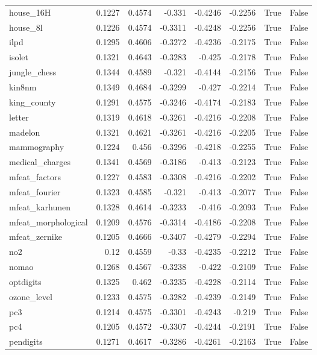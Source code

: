 \begin{table}
\begin{tabular}{lrrrrrrr}
house\_16H & 0.1227 & 0.4574 & -0.331 & -0.4246 & -0.2256 & True & False \\
house\_8l & 0.1226 & 0.4574 & -0.3311 & -0.4248 & -0.2256 & True & False \\
ilpd & 0.1295 & 0.4606 & -0.3272 & -0.4236 & -0.2175 & True & False \\
isolet & 0.1321 & 0.4643 & -0.3283 & -0.425 & -0.2178 & True & False \\
jungle\_chess & 0.1344 & 0.4589 & -0.321 & -0.4144 & -0.2156 & True & False \\
kin8nm & 0.1349 & 0.4684 & -0.3299 & -0.427 & -0.2214 & True & False \\
king\_county & 0.1291 & 0.4575 & -0.3246 & -0.4174 & -0.2183 & True & False \\
letter & 0.1319 & 0.4618 & -0.3261 & -0.4216 & -0.2208 & True & False \\
madelon & 0.1321 & 0.4621 & -0.3261 & -0.4216 & -0.2205 & True & False \\
mammography & 0.1224 & 0.456 & -0.3296 & -0.4218 & -0.2255 & True & False \\
medical\_charges & 0.1341 & 0.4569 & -0.3186 & -0.413 & -0.2123 & True & False \\
mfeat\_factors & 0.1227 & 0.4583 & -0.3308 & -0.4216 & -0.2202 & True & False \\
mfeat\_fourier & 0.1323 & 0.4585 & -0.321 & -0.413 & -0.2077 & True & False \\
mfeat\_karhunen & 0.1328 & 0.4614 & -0.3233 & -0.416 & -0.2093 & True & False \\
mfeat\_morphological & 0.1209 & 0.4576 & -0.3314 & -0.4186 & -0.2208 & True & False \\
mfeat\_zernike & 0.1205 & 0.4666 & -0.3407 & -0.4279 & -0.2294 & True & False \\
no2 & 0.12 & 0.4559 & -0.33 & -0.4235 & -0.2212 & True & False \\
nomao & 0.1268 & 0.4567 & -0.3238 & -0.422 & -0.2109 & True & False \\
optdigits & 0.1325 & 0.462 & -0.3235 & -0.4228 & -0.2114 & True & False \\
ozone\_level & 0.1233 & 0.4575 & -0.3282 & -0.4239 & -0.2149 & True & False \\
pc3 & 0.1214 & 0.4575 & -0.3301 & -0.4243 & -0.219 & True & False \\
pc4 & 0.1205 & 0.4572 & -0.3307 & -0.4244 & -0.2191 & True & False \\
pendigits & 0.1271 & 0.4617 & -0.3286 & -0.4261 & -0.2163 & True & False \\

\end{tabular}
\end{table}
